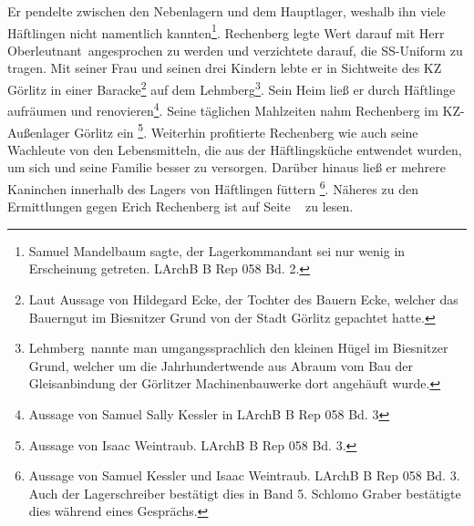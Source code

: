 Er pendelte zwischen den Nebenlagern und dem Hauptlager, weshalb ihn viele Häftlingen nicht namentlich kannten\footnote{Samuel Mandelbaum sagte, der Lagerkommandant sei nur wenig in Erscheinung getreten. LArchB B Rep 058 Bd. 2.}. Rechenberg legte Wert da\-rauf mit \glqq Herr Oberleutnant\grqq~angesprochen zu werden und verzichtete da\-rauf, die SS-Uniform zu tragen. Mit seiner Frau und seinen drei Kindern lebte er in Sichtweite des KZ Görlitz in einer Baracke\footnote{Laut Aussage von Hildegard Ecke, der Tochter des Bauern Ecke, welcher das Bauerngut im Biesnitzer Grund von der Stadt Görlitz gepachtet hatte.} auf dem \glqq Lehmberg\grqq\footnote{\glqq Lehmberg\grqq~nannte man umgangssprachlich den kleinen Hügel im Biesnitzer Grund, welcher um die Jahrhundertwende aus Abraum vom Bau der Gleisanbindung der Görlitzer Machinenbauwerke dort angehäuft wurde.}. Sein Heim ließ er durch Häftlinge aufräumen und renovieren\footnote{Aussage von Samuel Sally Kessler in LArchB B Rep 058 Bd. 3}. Seine täglichen Mahlzeiten nahm Rechenberg im KZ-Außenlager Görlitz ein
\footnote{Aussage von Isaac Weintraub. LArchB B Rep 058 Bd. 3.}. Weiterhin profitierte Rechenberg wie auch seine Wachleute von den Lebensmitteln, die aus der Häftlingsküche entwendet wurden, um sich und seine Familie besser zu versorgen. Darüber hinaus ließ er mehrere Kaninchen innerhalb des Lagers von Häftlingen füttern \footnote{Aussage von Samuel Kessler und Isaac Weintraub. LArchB B Rep 058 Bd. 3. Auch der Lagerschreiber bestätigt dies in Band 5. Schlomo Graber bestätigte dies während eines Gesprächs.}. Näheres zu den Ermittlungen gegen Erich Rechenberg ist auf Seite ~\pageref{rechenberg_ahndung} zu lesen.


